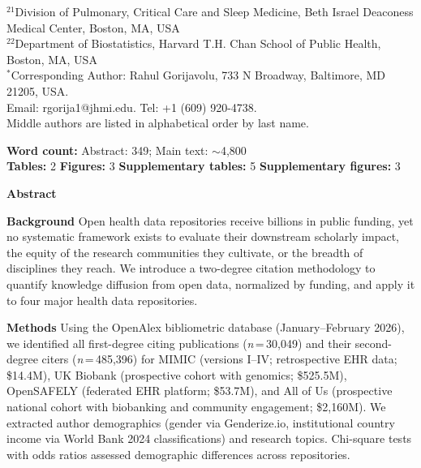\documentclass[11pt]{article}
\begin{document}
\begin{center}
{$^{21}$Division of Pulmonary, Critical Care and Sleep Medicine, Beth Israel Deaconess Medical Center, Boston, MA, USA\\
$^{22}$Department of Biostatistics, Harvard T.H. Chan School of Public Health, Boston, MA, USA\\[6pt]
$^{*}$Corresponding Author: Rahul Gorijavolu, 733 N Broadway, Baltimore, MD 21205, USA.\\
Email: rgorija1@jhmi.edu. Tel: +1 (609) 920-4738.\\[3pt]
Middle authors are listed in alphabetical order by last name.
}
\end{center}

\vspace{1em}

\noindent\textbf{Word count:} Abstract: 349; Main text: ${\sim}$4,800\\
\noindent\textbf{Tables:} 2 \quad \textbf{Figures:} 3 \quad \textbf{Supplementary tables:} 5 \quad \textbf{Supplementary figures:} 3

\newpage


\noindent\textbf{\large Abstract}

\vspace{0.5em}

\noindent\textbf{Background}\quad
Open health data repositories receive billions in public funding, yet no systematic framework exists to evaluate their downstream scholarly impact, the equity of the research communities they cultivate, or the breadth of disciplines they reach. We introduce a two-degree citation methodology to quantify knowledge diffusion from open data, normalized by funding, and apply it to four major health data repositories.

\noindent\textbf{Methods}\quad
Using the OpenAlex bibliometric database (January--February 2026), we identified all first-degree citing publications (\textit{n}\,=\,30,049) and their second-degree citers (\textit{n}\,=\,485,396) for MIMIC (versions I--IV; retrospective EHR data; \$14.4M), UK Biobank (prospective cohort with genomics; \$525.5M), OpenSAFELY (federated EHR platform; \$53.7M), and All of Us (prospective national cohort with biobanking and community engagement; \$2,160M). We extracted author demographics (gender via Genderize.io, institutional country income via World Bank 2024 classifications) and research topics. Chi-square tests with odds ratios assessed demographic differences across repositories.
\end{document}
